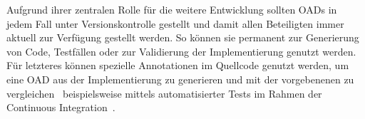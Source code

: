Aufgrund ihrer zentralen Rolle für die weitere Entwicklung sollten \acp{OAD} in jedem Fall unter Versionskontrolle gestellt und damit allen Beteiligten immer aktuell zur Verfügung gestellt werden.
So können sie permanent zur Generierung von Code, Testfällen oder zur Validierung der Implementierung genutzt werden.
Für letzteres können spezielle Annotationen im Quellcode genutzt werden, um eine \ac{OAD} aus der Implementierung zu generieren und mit der vorgebenenen zu vergleichen \textendash\ beispielsweise mittels automatisierter Tests im Rahmen der Continuous Integration~\cite{ope24}.